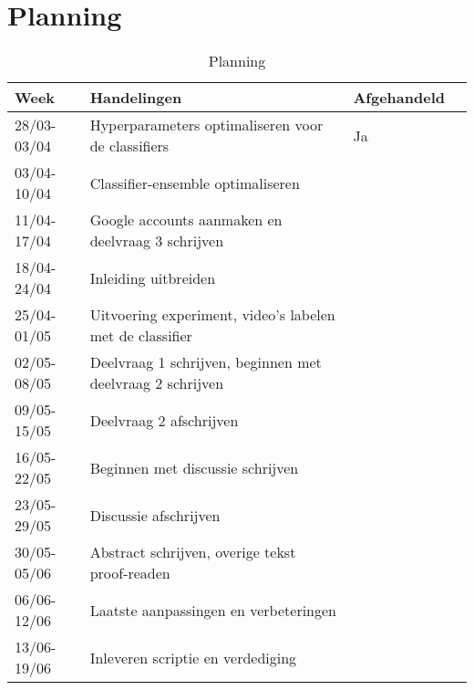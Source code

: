 \documentclass[../main.tex]{subfiles}
\begin{document}
\section{Planning}

\begin{table}[!b]
\centering
\caption{Planning}
\label{tab:my-table}
\begin{tabular}{@{}ll@{}ll@{}}
\toprule
Week        & Handelingen                                                     & Afgehandeld \\ \midrule
28/03-03/04 & Hyperparameters optimaliseren voor de classifiers               &     Ja      \\
03/04-10/04 & Classifier-ensemble optimaliseren                               &             \\
11/04-17/04 & Google accounts aanmaken en deelvraag 3 schrijven               &             \\
18/04-24/04 & Inleiding uitbreiden                                            &             \\
25/04-01/05 & Uitvoering experiment, video's labelen met de classifier        &             \\
02/05-08/05 & Deelvraag 1 schrijven, beginnen met deelvraag 2 schrijven       &             \\
09/05-15/05 & Deelvraag 2 afschrijven                                         &             \\
16/05-22/05 & Beginnen met discussie schrijven                                &             \\
23/05-29/05 & Discussie afschrijven                                           &             \\
30/05-05/06 & Abstract schrijven, overige tekst proof-readen                  &             \\
06/06-12/06 & Laatste aanpassingen en verbeteringen                           &             \\
13/06-19/06 & Inleveren scriptie en verdediging                               &             \\ \bottomrule
\end{tabular}
\end{table}
\end{document}

